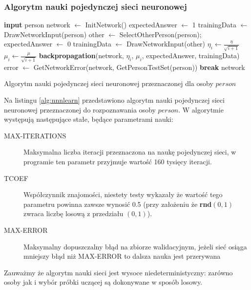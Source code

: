 \documentclass[a4paper]{article}
\begin{document}
	\subsubsection*{Algorytm nauki pojedynczej sieci neuronowej}	
	\begin{algorithm}[h]
		\begin{algorithmic}[1]
			\STATE \textbf{input} person
			\STATE
			\STATE network $\leftarrow$ InitNetwork()
				\STATE expectedAnswer $\leftarrow$ 1
				\STATE trainingData $\leftarrow$ DrawNetworkInput(person)
					\STATE other $\leftarrow$ SelectOtherPerson(person);
					\STATE expectedAnswer $\leftarrow$ 0
					\STATE trainingData $\leftarrow$ DrawNetworkInput(other)				
				\ENDIF
				\STATE
				\STATE $\eta_i \leftarrow \frac{\eta}{\sqrt{i + 1}}$
				\STATE $\mu_i \leftarrow \frac{\mu}{\sqrt{i + 1}}$
				\STATE				
				\STATE \textbf{backpropagation}(network, $\eta_i$, $\mu_i$, expectedAnswer, trainingData)
				\STATE
				\STATE {}
				\STATE {}
				\STATE error $\leftarrow$ GetNetworkError(network, GetPersonTestSet(person))
					\STATE \textbf{break}
				\ENDIF
			\ENDFOR
			\STATE
			\RETURN network
		\end{algorithmic}			
		\caption{Algorytm nauki pojedynczej sieci neuronowej przeznaczonej dla osoby $person$}
		\label{alg:nnnlearn}
	\end{algorithm}
	Na listingu \ref{alg:nnnlearn} przedstawiono algorytm nauki pojedynczej sieci neuronowej przeznaczonej
	do rozpoznawania osoby $person$. W algorytmie występują następujące stałe, będące parametrami nauki:
	\begin{description}
		\item[MAX-ITERATIONS] 
			Maksymalna liczba iteracji przeznaczona na naukę pojedynczej sieci,
			w programie ten parametr przyjmuje wartość 160 tysięcy iteracji.
		\item[TCOEF]
			Współczynnik znajomości, niestety testy wykazały że wartość tego parametru powinna zawsze
			wynosić 0.5 (przy założeniu że \textbf{rnd}$(0,1)$ zwraca liczbę losową z przedziału $(0, 1)$).
		\item[MAX-ERROR]
			Maksymalny dopuszczalny błąd na zbiorze walidacyjnym, jeżeli sieć osiąga mniejszy błąd
			niż MAX-ERROR to dalsza
			nauka jest przerywana
	\end{description}
	Zauważmy że algorytm nauki sieci jest wysoce niedeterministyczny: zarówno osoby jak i wybór próbki
	uczącej są dokonywane w sposób losowy.
	
\end{document}
